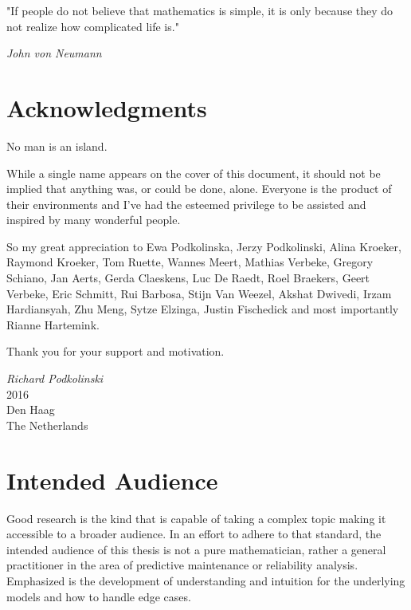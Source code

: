 \thispagestyle{empty}
\vspace*{20px}
\begin{displayquote}
"If people do not believe that mathematics is simple, it is only because they do not realize how complicated life is." 
\end{displayquote}

\begin{flushright}
\textit{John von Neumann}
\end{flushright}

\vspace*{25px}

\section*{Acknowledgments}

No man is an island.

While a single name appears on the cover of this document, it should not be implied that anything was, or could be done, alone. Everyone is the product of their environments and I've had the esteemed privilege to be assisted and inspired by many wonderful people. 

So my great appreciation to Ewa Podkolinska, Jerzy Podkolinski, Alina Kroeker, Raymond Kroeker, Tom Ruette, Wannes Meert, Mathias Verbeke, Gregory Schiano, Jan Aerts, Gerda Claeskens, Luc De Raedt, Roel Braekers, Geert Verbeke, Eric Schmitt, Rui Barbosa, Stijn Van Weezel, Akshat Dwivedi, Irzam Hardiansyah, Zhu Meng, Sytze Elzinga, Justin Fischedick and most importantly Rianne Hartemink.

Thank you for your support and motivation. 

\begin{flushright}
\textit{Richard Podkolinski}
\\
2016 
\\
Den Haag
\\
The Netherlands
\end{flushright}

\vspace*{25px}

\section*{Intended Audience}

Good research is the kind that is capable of taking a complex topic making it accessible to a broader audience. In an effort to adhere to that standard, the intended audience of this thesis is not a pure mathematician, rather a general practitioner in the area of predictive maintenance or reliability analysis. Emphasized is the development of understanding and intuition for the underlying models and how to handle edge cases. 

